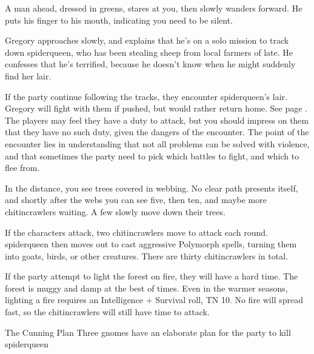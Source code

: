 \begin{multicols}{2}
\begin{boxtext}

	A man ahead, dressed in greens, stares at you, then slowly wanders forward.  He puts his finger to his mouth, indicating you need to be silent.

\end{boxtext}

Gregory approaches slowly, and explains that he's on a solo mission to track down \gls{spiderqueen}, who has been stealing sheep from local farmers of late.
He confesses that he's terrified, because he doesn't know when he might suddenly find her lair.

If the party continue following the tracks, they encounter \gls{spiderqueen}'s lair.
Gregory will fight with them if pushed, but would rather return home.
See page \pageref{spiderqueen}.
The players may feel they have a duty to attack, but you should impress on them that they have no such duty, given the dangers of the encounter.
The point of the encounter lies in understanding that not all problems can be solved with violence, and that sometimes the party need to pick which battles to fight, and which to flee from.

\begin{boxtext}
	In the distance, you see trees covered in webbing.  No clear path presents itself, and shortly after the webs you can see five, then ten, and maybe more chitincrawlers waiting.  A few slowly move down their trees.
\end{boxtext}

If the characters attack, two chitincrawlers move to attack each round.
\Gls{spiderqueen} then moves out to cast aggressive Polymorph spells, turning them into goats, birds, or other creatures.
There are thirty chitincrawlers in total.

If the party attempt to light the forest on fire, they will have a hard time.
The forest is muggy and damp at the best of times.
Even in the warmer seasons, lighting a fire requires an Intelligence + Survival roll, TN 10.
No fire will spread fast, so the chitincrawlers will still have time to attack.


{The Cunning Plan}%
{Three gnomes have an elaborate plan for the party to kill \gls{spiderqueen}}%

\begin{boxtext}


\end{boxtext}
\end{multicols}
